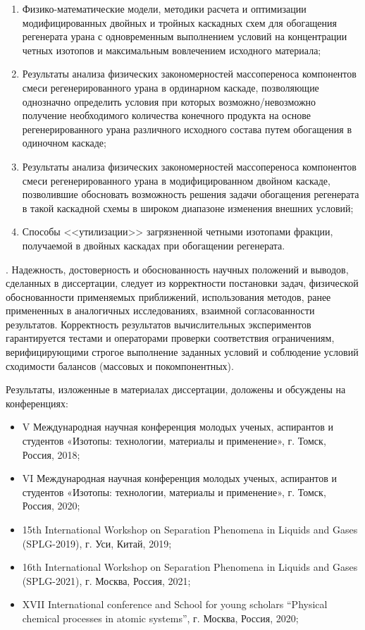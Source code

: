 {}
\begin{enumerate}
  \item Физико-математические модели, методики расчета и оптимизации модифицированных двойных и тройных каскадных схем для обогащения регенерата урана с одновременным выполнением условий на концентрации четных изотопов и максимальным вовлечением исходного материала;
  \item Результаты анализа физических закономерностей массопереноса компонентов смеси регенерированного урана в ординарном каскаде, позволяющие однозначно определить условия при которых возможно/невозможно получение необходимого количества конечного продукта на основе регенерированного урана различного исходного состава путем обогащения в одиночном каскаде;
  \item Результаты анализа физических закономерностей массопереноса компонентов смеси регенерированного урана в модифицированном двойном каскаде, позволившие обосновать возможность решения задачи обогащения регенерата в такой каскадной схемы в широком диапазоне изменения внешних условий;
  \item Способы <<утилизации>> загрязненной четными изотопами фракции, получаемой в двойных каскадах при обогащении регенерата. 
\end{enumerate}

{\reliability}.
Надежность, достоверность и обоснованность научных положений и выводов, сделанных в диссертации, следует из корректности постановки задач, физической обоснованности применяемых приближений, использования методов, ранее примененных в аналогичных исследованиях, взаимной согласованности результатов. Корректность результатов вычислительных экспериментов гарантируется тестами и операторами проверки соответствия ограничениям, верифицирующими строгое выполнение заданных условий и соблюдение условий сходимости балансов (массовых и покомпонентных).

{\probation}
Результаты, изложенные в материалах диссертации, доложены и обсуждены на конференциях:
\begin{itemize}
  \item V Международная научная конференция молодых ученых, аспирантов и студентов «Изотопы: технологии, материалы и применение», г. Томск, Россия, 2018;
  \item VI Международная научная конференция молодых ученых, аспирантов и студентов «Изотопы: технологии, материалы и применение», г. Томск, Россия, 2020;
  \item 15th International Workshop on Separation Phenomena in Liquids and Gases (SPLG-2019), г. Уси, Китай, 2019;
  \item 16th International Workshop on Separation Phenomena in Liquids and Gases (SPLG-2021), г. Москва, Россия, 2021;
  \item XVII International conference and School for young scholars “Physical chemical processes in atomic systems”, г. Москва, Россия, 2020;
\end{itemize}

